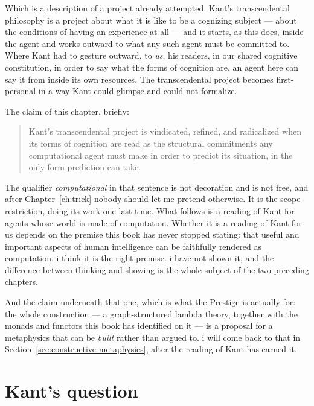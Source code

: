 Which is a description of a project already attempted.
Kant's transcendental philosophy is a project about what it is like
to be a cognizing subject --- about the conditions of having an
experience at all --- and it starts, as this does, inside the agent
and works outward to what any such agent must be committed to.
Where Kant had to gesture outward, to \emph{us}, his readers, in
our shared cognitive constitution, in order to say what the forms
of cognition are, an agent here can say it from inside its own
resources.
The transcendental project becomes first-personal in a way Kant
could glimpse and could not formalize.

The claim of this chapter, briefly:

\begin{quote}
Kant's transcendental project is vindicated, refined, and
radicalized when its forms of cognition are read as the structural
commitments any computational agent must make in order to predict
its situation, in the only form prediction can take.
\end{quote}

\noindent
The qualifier \emph{computational} in that sentence is not
decoration and is not free, and after Chapter~\ref{ch:trick} nobody
should let me pretend otherwise.
It is the scope restriction, doing its work one last time.
What follows is a reading of Kant for agents whose world is made of
computation.
Whether it is a reading of Kant for us depends on the premise this
book has never stopped stating: that useful and important aspects
of human intelligence can be faithfully rendered as computation.
i think it is the right premise.
i have not shown it, and the difference between thinking and
showing is the whole subject of the two preceding chapters.

\noindent
And the claim underneath that one, which is what the Prestige is
actually for: the whole construction --- a graph-structured lambda
theory, together with the monads and functors this book has
identified on it --- is a proposal for a metaphysics that can be
\emph{built} rather than argued to.
i will come back to that in Section~\ref{sec:constructive-metaphysics},
after the reading of Kant has earned it.

\section{Kant's question}
\label{sec:kant-recap}

